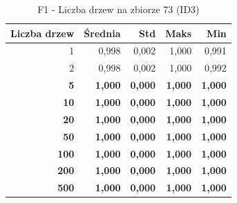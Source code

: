 \begin{table}[htbp]
\centering
\small
\setlength{\tabcolsep}{6pt}
\renewcommand{\arraystretch}{1.2}
\caption{F1 - Liczba drzew na zbiorze 73 (ID3)}
\label{tab:ID3_tree_count_73_f1}
\begin{tabular}{r|r|r|r|r}
\toprule
Liczba drzew & Średnia & Std & Maks & Min \\
\hline
1 & 0,998 & 0,002 & 1,000 & 0,991 \\
2 & 0,998 & 0,002 & 1,000 & 0,992 \\
\textbf{5} & \textbf{1,000} & \textbf{0,000} & \textbf{1,000} & \textbf{1,000} \\
\textbf{10} & \textbf{1,000} & \textbf{0,000} & \textbf{1,000} & \textbf{1,000} \\
\textbf{20} & \textbf{1,000} & \textbf{0,000} & \textbf{1,000} & \textbf{1,000} \\
\textbf{50} & \textbf{1,000} & \textbf{0,000} & \textbf{1,000} & \textbf{1,000} \\
\textbf{100} & \textbf{1,000} & \textbf{0,000} & \textbf{1,000} & \textbf{1,000} \\
\textbf{200} & \textbf{1,000} & \textbf{0,000} & \textbf{1,000} & \textbf{1,000} \\
\textbf{500} & \textbf{1,000} & \textbf{0,000} & \textbf{1,000} & \textbf{1,000} \\
\bottomrule
\end{tabular}
\end{table}